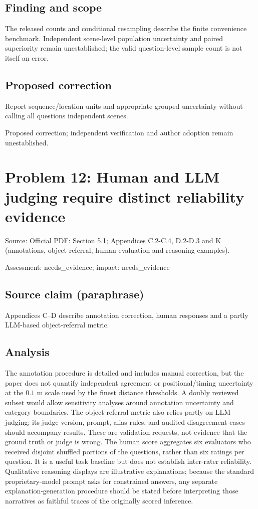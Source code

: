 \documentclass[11pt]{article}
\begin{document}
\subsection*{Finding and scope}

The released counts and conditional resampling describe the finite convenience benchmark. Independent scene-level population uncertainty and paired superiority remain unestablished; the valid question-level sample count is not itself an error.

\subsection*{Proposed correction}

Report sequence/location units and appropriate grouped uncertainty without calling all questions independent scenes.

Proposed correction; independent verification and author adoption remain unestablished.

\section*{Problem 12: Human and LLM judging require distinct reliability evidence}

Source: Official PDF: Section 5.1; Appendices C.2-C.4, D.2-D.3 and K (annotations, object referral, human evaluation and reasoning examples).

Assessment: needs\_evidence; impact: needs\_evidence

\subsection*{Source claim (paraphrase)}

Appendices C--D describe annotation correction, human responses and a partly LLM-based object-referral metric.

\subsection*{Analysis}

The annotation procedure is detailed and includes manual correction, but the paper does not quantify independent agreement or positional/timing uncertainty at the \(0.1\) m scale used by the finest distance thresholds. A doubly reviewed subset would allow sensitivity analyses around annotation uncertainty and category boundaries. The object-referral metric also relies partly on LLM judging; its judge version, prompt, alias rules, and audited disagreement cases should accompany results. These are validation requests, not evidence that the ground truth or judge is wrong. The human score aggregates six evaluators who received disjoint shuffled portions of the questions, rather than six ratings per question. It is a useful task baseline but does not establish inter-rater reliability. Qualitative reasoning displays are illustrative explanations; because the standard proprietary-model prompt asks for constrained answers, any separate explanation-generation procedure should be stated before interpreting those narratives as faithful traces of the originally scored inference.
\end{document}
